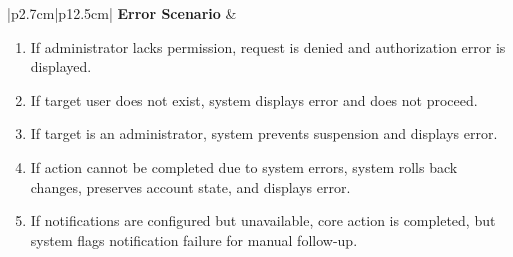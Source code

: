 \begin{table}[H]
\begin{tabular}{|p{2.7cm}|p{12.5cm}|}
        \textbf{Error Scenario} & \begin{minipage}[t]{\linewidth}
                                      \begin{enumerate}[topsep=0pt,itemsep=1pt,parsep=0pt,partopsep=0pt]
                                          \item If administrator lacks permission, request is denied and authorization error is displayed.
                                          \item If target user does not exist, system displays error and does not proceed.
                                          \item If target is an administrator, system prevents suspension and displays error.
                                          \item If action cannot be completed due to system errors, system rolls back changes, preserves account state, and displays error.
                                          \item If notifications are configured but unavailable, core action is completed, but system flags notification failure for manual follow-up.
                                      \end{enumerate}
                                  \end{minipage} \\ \hline
    \end{tabular}
    \label{tab:admin-suspend-unsuspend-user}
\end{table}

